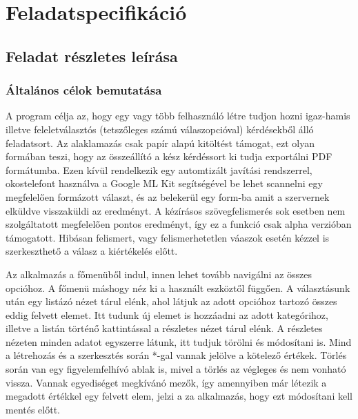 \chapter{Feladatspecifikáció}
\label{sec:Sepcification}

\section{Feladat részletes leírása}
\label{sec:SepcificationDescription}


\subsection{Általános célok bemutatása}


A program célja az, hogy egy vagy több felhasználó létre tudjon hozni igaz-hamis illetve feleletválasztós (tetszőleges számú válaszopcióval) kérdésekből álló feladatsort.
Az alaklamazás csak papír alapú kitöltést támogat, ezt olyan formában teszi, hogy az összeállító a kész kérdéssort ki tudja exportálni PDF formátumba.
Ezen kívül rendelkezik egy automtizált javítási rendszerrel, okostelefont használva a Google ML Kit\cite{MLKit} segítségével be lehet scannelni egy megfelelően formázott választ, és az belekerül egy form-ba amit a szervernek elküldve visszaküldi az eredményt.
A kézírásos szövegfelismerés sok esetben nem szolgáltatott megfelelően pontos eredményt, így ez a funkció csak alpha verzióban támogatott.
Hibásan felismert, vagy felismerhetetlen váaszok esetén kézzel is szerkeszthető a válasz a kiértékelés előtt.

Az alkalmazás a főmenüből indul, innen lehet tovább navigálni az összes opcióhoz.
A főmenü máshogy néz ki a használt eszköztől függően.
A választásunk után egy listázó nézet tárul elénk, ahol látjuk az adott opcióhoz tartozó összes eddig felvett elemet.
Itt tudunk új elemet is hozzáadni az adott kategórihoz, illetve a listán történő kattintással a részletes nézet tárul elénk.
A részletes nézeten minden adatot egyszerre látunk, itt tudjuk törölni és módosítani is.
Mind a létrehozás és a szerkesztés során *-gal vannak jelölve a kötelező értékek. Törlés során van egy figyelemfelhívó ablak is, mivel a törlés az végleges és nem vonható vissza.
Vannak egyediséget megkívánó mezők, így amennyiben már létezik a megadott értékkel egy felvett elem, jelzi a za alkalmazás, hogy ezt módosítani kell mentés előtt.

